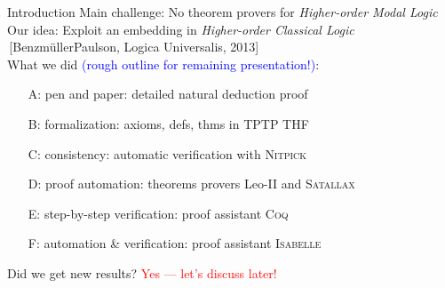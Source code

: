 \begin{frame}{Introduction} \large
Main challenge: \hfill No theorem provers for \emph{Higher-order Modal Logic} \\[1em]

Our idea: \hfill Exploit an embedding in \emph{Higher-order Classical Logic} \\
\,\hfill {\small [Benzm\"ullerPaulson, Logica Universalis, 2013]} \\[2em]

What we did \textcolor{blue}{(rough outline for remaining
  presentation!)}: \\

\begin{itemize}
\item[A:] pen and paper: detailed natural deduction proof 
\item[B:] formalization: axioms, defs, thms  in \textsc{TPTP THF}
\item[C:] consistency: automatic verification with \textsc{Nitpick} 
\item[D:] proof automation: theorems provers Leo-II and \textsc{Satallax} 
\item[E:] step-by-step verification: proof assistant \textsc{Coq} 
\item[F:] automation \& verification: proof assistant 
  \textsc{Isabelle} \\[2em]
\end{itemize}
Did we get new results? \hfill  \textcolor{red}{Yes --- let's discuss later!}
\end{frame}
